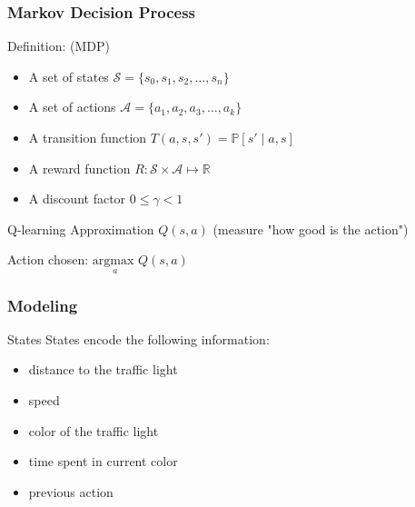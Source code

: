 \documentclass[dvipsnames,svgnames]{beamer}
\begin{document}
\begin{frame}
\frametitle{Markov Decision Process}
\begin{block}{Definition: (MDP) }
\begin{itemize}
\item A set of states $\mathcal{S}=\{s_0,s_1,s_2,\ldots,s_{n}\}$
\item A set of actions $\mathcal{A}=\{a_1,a_2,a_3,\ldots,a_{k}\}$
\item A transition function $T(a,s,s') = \mathbb{P}[s'\mid a,s]$
\item A reward function $R: \mathcal{S} \times \mathcal{A}\mapsto \mathbb{R}$
\item A discount factor $0 \leq \gamma < 1$ 
\end{itemize}
\end{block}

\begin{block}{Q-learning}
Approximation $Q(s,a)$ (measure "how good is the action")

Action chosen: $\underset{a}{\text{argmax }}Q(s,a)$
\end{block}
\end{frame}

\begin{frame}
\frametitle{Modeling}
\begin{block}{States}
States encode the following information:
\begin{itemize}
\item distance to the traffic light
\item speed 
\item color of the traffic light
\item time spent in current color 
\item previous action 
\end{itemize}
\end{block}
\end{frame}
\end{document}

